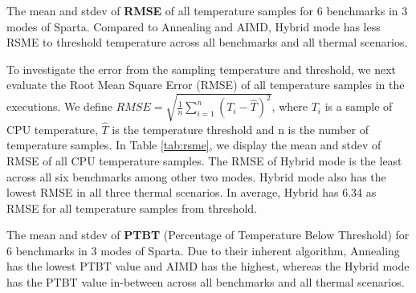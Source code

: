 \begin{table}[t]
\caption{The mean and stdev of \textbf{RMSE} of all temperature samples for 6 benchmarks in 3 modes of Sparta. Compared to Annealing and AIMD, Hybrid mode has less RSME to threshold temperature across all benchmarks and all thermal scenarios.}\label{tab:rsme}
\vspace{1mm}
\centering
\resizebox{350pt}{!}{}
\newline
\vspace{3mm}
\newline
\resizebox{300pt}{!}{}
\end{table}


To investigate the error from the sampling temperature and threshold, we next evaluate the Root Mean Square Error (RMSE) of all temperature samples in the executions. We define $RMSE = \sqrt{\frac{1}{n}\sum_{i=1}^{n}(T_i - \hat{T})^2}$, where $T_i$ is a sample of CPU temperature, $\hat{T}$ is the temperature threshold and n is the number of temperature samples. In Table \ref{tab:rsme}, we display the mean and stdev of RMSE of all CPU temperature samples. The RMSE of Hybrid mode is the least across all six benchmarks among other two modes. Hybrid mode also has the lowest RMSE in all three thermal scenarios. In average, Hybrid has 6.34 as RMSE for all temperature samples from threshold. 


\begin{table}[t]
\caption{The mean and stdev of \textbf{PTBT} (Percentage of Temperature Below Threshold) for 6 benchmarks in 3 modes of Sparta. Due to their inherent algorithm, Annealing has the lowest PTBT value and AIMD has the highest, whereas the Hybrid mode has the PTBT value in-between across all benchmarks and all thermal scenarios.}\label{tab:percent}
\vspace{1mm}
\centering
\resizebox{350pt}{!}{}
\newline
\vspace{3mm}
\newline
\resizebox{300pt}{!}{}
\end{table}


